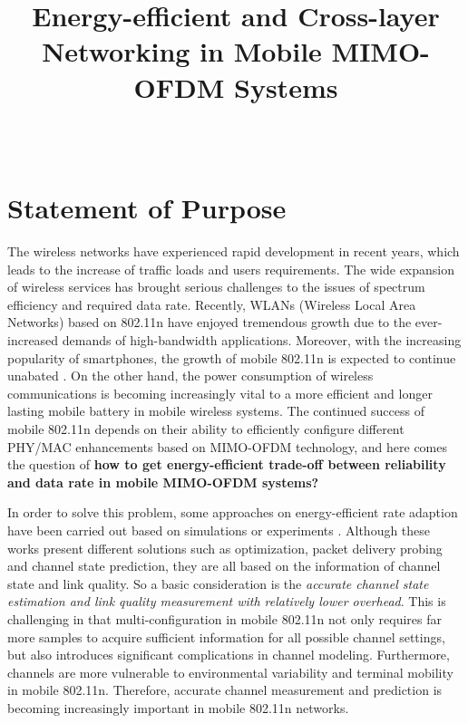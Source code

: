 \documentclass[draftclsnofoot,journal,onecolumn,11pt]{IEEEtran}
\begin{document}
\title{Energy-efficient and Cross-layer Networking in Mobile MIMO-OFDM Systems}

\author{ \\
}

\maketitle
%


\section{Statement of Purpose}

The wireless networks have experienced rapid development in recent years, which leads to the increase of traffic loads and users requirements. The wide expansion of wireless services has brought serious challenges to the issues of spectrum efficiency and required data rate. Recently, WLANs (Wireless Local Area Networks) based on 802.11n have enjoyed tremendous growth due to the ever-increased demands of high-bandwidth applications. Moreover, with the increasing popularity of smartphones, the growth of mobile 802.11n is expected to continue unabated \cite{Bala2010wifi}. On the other hand, the power consumption of wireless communications is becoming increasingly vital to a more efficient and longer lasting mobile battery in mobile wireless systems. The continued success of mobile 802.11n depends on their ability to efficiently configure different PHY/MAC enhancements based on MIMO-OFDM technology, and here comes the question of \textbf{how to get energy-efficient trade-off between reliability and data rate in mobile MIMO-OFDM systems?}

In order to solve this problem, some approaches on energy-efficient rate adaption have been carried out based on simulations \cite{5510775} \cite{6214414} or experiments \cite{Peng:2011:TPS:2030613.2030628} \cite{Li:2012:ERA:2348543.2348585}. Although these works present different solutions such as optimization, packet delivery probing and channel state prediction, they are all based on the information of channel state and link quality. So a basic consideration is the \textit{accurate channel state estimation and link quality measurement with relatively lower overhead}. This is challenging in that multi-configuration in mobile 802.11n not only requires far more samples to acquire sufficient information for all possible channel settings, but also introduces significant complications in channel modeling. Furthermore, channels are more vulnerable to environmental variability and terminal mobility in mobile 802.11n. Therefore, accurate channel measurement and prediction is becoming increasingly important in mobile 802.11n networks.
\end{document}
